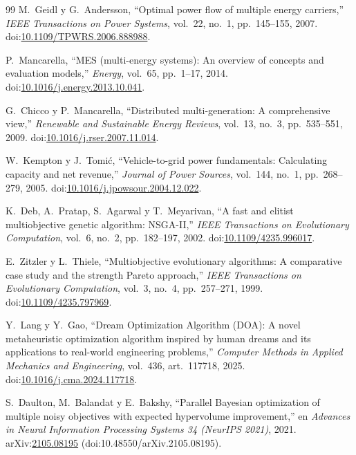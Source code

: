 \begin{thebibliography}{99}
 M.~Geidl y G.~Andersson, ``Optimal power flow of multiple
energy carriers,'' \emph{IEEE Transactions on Power Systems}, vol.~22, no.~1,
pp.~145--155, 2007.
doi:\href{https://doi.org/10.1109/TPWRS.2006.888988}{10.1109/TPWRS.2006.888988}.

 P.~Mancarella, ``MES (multi-energy systems): An overview of
concepts and evaluation models,'' \emph{Energy}, vol.~65, pp.~1--17, 2014.
doi:\href{https://doi.org/10.1016/j.energy.2013.10.041}{10.1016/j.energy.2013.10.041}.

 G.~Chicco y P.~Mancarella, ``Distributed multi-generation: A
comprehensive view,'' \emph{Renewable and Sustainable Energy Reviews}, vol.~13, no.~3,
pp.~535--551, 2009.
doi:\href{https://doi.org/10.1016/j.rser.2007.11.014}{10.1016/j.rser.2007.11.014}.

 W.~Kempton y J.~Tomi\'c, ``Vehicle-to-grid power fundamentals:
Calculating capacity and net revenue,'' \emph{Journal of Power Sources}, vol.~144,
no.~1, pp.~268--279, 2005.
doi:\href{https://doi.org/10.1016/j.jpowsour.2004.12.022}{10.1016/j.jpowsour.2004.12.022}.

 K.~Deb, A.~Pratap, S.~Agarwal y T.~Meyarivan, ``A fast and elitist
multiobjective genetic algorithm: NSGA-II,'' \emph{IEEE Transactions on Evolutionary
Computation}, vol.~6, no.~2, pp.~182--197, 2002.
doi:\href{https://doi.org/10.1109/4235.996017}{10.1109/4235.996017}.

 E.~Zitzler y L.~Thiele, ``Multiobjective evolutionary
algorithms: A comparative case study and the strength Pareto approach,'' \emph{IEEE
Transactions on Evolutionary Computation}, vol.~3, no.~4, pp.~257--271, 1999.
doi:\href{https://doi.org/10.1109/4235.797969}{10.1109/4235.797969}.

 Y.~Lang y Y.~Gao, ``Dream Optimization Algorithm (DOA): A novel
metaheuristic optimization algorithm inspired by human dreams and its applications to
real-world engineering problems,'' \emph{Computer Methods in Applied Mechanics and
Engineering}, vol.~436, art.~117718, 2025.
doi:\href{https://doi.org/10.1016/j.cma.2024.117718}{10.1016/j.cma.2024.117718}.

 S.~Daulton, M.~Balandat y E.~Bakshy, ``Parallel Bayesian
optimization of multiple noisy objectives with expected hypervolume improvement,''
en \emph{Advances in Neural Information Processing Systems 34 (NeurIPS 2021)}, 2021.
arXiv:\href{https://doi.org/10.48550/arXiv.2105.08195}{2105.08195}
(doi:10.48550/arXiv.2105.08195).


\end{thebibliography}
